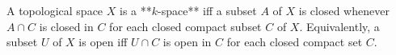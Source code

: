 A topological space $X$ is a **$k$-space** iff a subset $A$ of $X$ is closed whenever $A \cap C$ is closed in $C$ for each closed compact subset $C$ of $X$. Equivalently, a subset $U$ of $X$ is open iff $U \cap C$ is open in $C$ for each closed compact set $C$.

